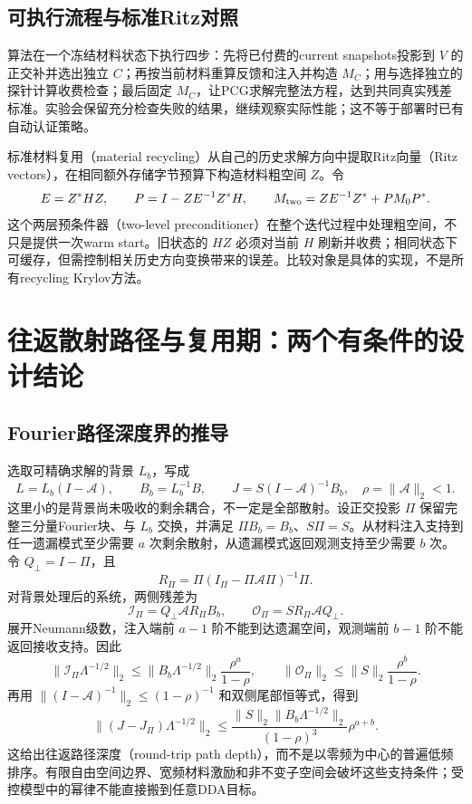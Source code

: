 \subsection{可执行流程与标准Ritz对照}
算法在一个冻结材料状态下执行四步：先将已付费的current snapshots投影到 $V$ 的正交补并选出独立 $C$；再按当前材料重算反馈和注入并构造 $M_C$；用与选择独立的探针计算收费检查；最后固定 $M_C$，让PCG求解完整法方程，达到共同真实残差标准。实验会保留充分检查失败的结果，继续观察实际性能；这不等于部署时已有自动认证策略。

标准材料复用（material recycling）从自己的历史求解方向中提取Ritz向量（Ritz vectors），在相同额外存储字节预算下构造材料粗空间 $Z$。令
\begin{equation}
 E=Z^*HZ,\qquad P=I-ZE^{-1}Z^*H,
 \qquad M_{\rm two}=ZE^{-1}Z^*+PM_0P^*.
\end{equation}
这个两层预条件器（two-level preconditioner）在整个迭代过程中处理粗空间，不只是提供一次warm start。旧状态的 $HZ$ 必须对当前 $H$ 刷新并收费；相同状态下可缓存，但需控制相关历史方向变换带来的误差。比较对象是具体的实现，不是所有recycling Krylov方法。

\section{往返散射路径与复用期：两个有条件的设计结论}
\subsection{Fourier路径深度界的推导}
选取可精确求解的背景 $L_b$，写成
\begin{equation}
 L=L_b(I-\mathcal A),\qquad B_b=L_b^{-1}B,\qquad
 J=S(I-\mathcal A)^{-1}B_b,\quad\rho=\|\mathcal A\|_2<1.
\end{equation}
这里小的是背景尚未吸收的剩余耦合，不一定是全部散射。设正交投影 $\Pi$ 保留完整三分量Fourier块、与 $L_b$ 交换，并满足 $\Pi B_b=B_b$、$S\Pi=S$。从材料注入支持到任一遗漏模式至少需要 $a$ 次剩余散射，从遗漏模式返回观测支持至少需要 $b$ 次。令 $Q_\perp=I-\Pi$，且
\begin{equation}
 R_\Pi=\Pi(I_\Pi-\Pi\mathcal A\Pi)^{-1}\Pi.
\end{equation}
对背景处理后的系统，两侧残差为
\begin{equation}
 \mathcal I_\Pi=Q_\perp\mathcal A R_\Pi B_b,\qquad
 \mathcal O_\Pi=SR_\Pi\mathcal A Q_\perp.
\end{equation}
展开Neumann级数，注入端前 $a-1$ 阶不能到达遗漏空间，观测端前 $b-1$ 阶不能返回接收支持。因此
\begin{equation}
 \|\mathcal I_\Pi\Lambda^{-1/2}\|_2
 \le\|B_b\Lambda^{-1/2}\|_2\frac{\rho^a}{1-\rho},\qquad
 \|\mathcal O_\Pi\|_2\le\|S\|_2\frac{\rho^b}{1-\rho}.
\end{equation}
再用 $\|(I-\mathcal A)^{-1}\|_2\le(1-\rho)^{-1}$ 和双侧尾部恒等式，得到
\begin{equation}
 \boxed{\|(J-J_\Pi)\Lambda^{-1/2}\|_2
 \le\frac{\|S\|_2\|B_b\Lambda^{-1/2}\|_2}{(1-\rho)^3}\rho^{a+b}.}
\end{equation}
这给出往返路径深度（round-trip path depth），而不是以零频为中心的普遍低频排序。有限自由空间边界、宽频材料激励和非不变子空间会破坏这些支持条件；受控模型中的幂律不能直接搬到任意DDA目标。

